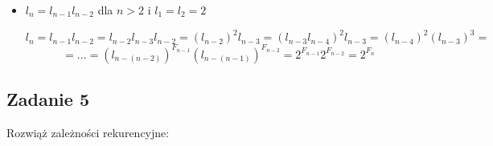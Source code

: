 \documentclass[a4paper]{article}
\DeclarePairedDelimiter\floor{\lfloor}{\rfloor}
\begin{document}
\begin{itemize}
\begin{proof}
\begin{enumerate}[(1)]
$*$ - korzystamy z nieparzystości $n$, w szczególności z tego, że $\frac{n+1}{2}=\floor{\frac{n+1}{2}}$ bo $\frac{n+1}{2}$ jest całkowite.
\end{enumerate}
\end{proof}

\item $l_n=l_{n-1}l_{n-2}$ dla $n>2$ i $l_1=l_2=2$

$$l_n=l_{n-1}l_{n-2}=l_{n-2}l_{n-3}l_{n-2} = (l_{n-2})^2 l_{n-3} = (l_{n-3}l_{n-4})^2 l_{n-3}=(l_{n-4})^2 (l_{n-3})^3 =$$ $$=\ldots = (l_{n-(n-2)})^{F_{n-1}}(l_{n-(n-1)})^{F_{n-2}} = 2^{F_{n-1}}2^{F_{n-2}}=2^{F_n}$$
\end{itemize}

\subsection*{Zadanie 5}
Rozwiąż zależności rekurencyjne:
\end{document}
